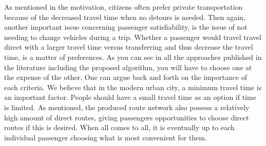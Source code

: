 As mentioned in the motivation, citizens often prefer private transportation because of the decreased travel time when no detours is needed. Then again, another important issue concerning passenger satisfiability, is the issue of not needing to change vehicles during a trip. Whether a passenger would travel travel direct with a larger travel time versus transferring and thus decrease the travel time, is a matter of preferences. As you can see in all the approaches published in the literature including the proposed algorithm, you will have to choose one at the expense of the other. One can argue back and forth on the importance of each criteria. We believe that in the modern urban city, a minimum travel time is an important factor. People should have a small travel time as an option if time is limited. As mentioned, the produced route network also possess a relatively high amount of direct routes, giving passengers opportunities to choose direct routes if this is desired. %
When all comes to all, it is eventually up to each individual passenger choosing what is most convenient for them. 


